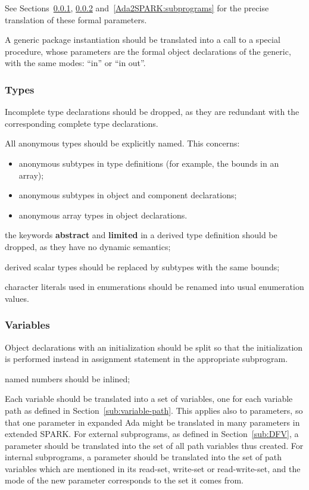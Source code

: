 \documentclass{article}
\newcounter{example}
\newcommand{\kw}[1]{\textbf{#1}}
\begin{document}
See Sections~\ref{Ada2SPARK:types}, \ref{Ada2SPARK:variables}
and~\ref{Ada2SPARK:subprograms} for the precise translation of these formal
parameters.

A generic package instantiation should be translated into a call to a special
procedure, whose parameters are the formal object declarations of the generic,
with the same modes: ``in'' or ``in out''.

\subsubsection{Types}
\label{Ada2SPARK:types}

Incomplete type declarations should be dropped, as they are redundant with the
corresponding complete type declarations.

All anonymous types should be explicitly named. This concerns:
\begin{itemize}
\item anonymous subtypes in type definitions (for example, the bounds in an
  array);
\item anonymous subtypes in object and component declarations;
\item anonymous array types in object declarations.
\end{itemize}

the keywords \kw{abstract} and \kw{limited} in a derived type definition
  should be dropped, as they have no dynamic semantics;

derived scalar types should be replaced by subtypes with the same bounds;

character literals used in enumerations should be renamed into usual
  enumeration values.

\subsubsection{Variables}
\label{Ada2SPARK:variables}

Object declarations with an initialization should be split so that the
initialization is performed instead in assignment statement in the appropriate
subprogram.

named numbers should be inlined;

Each variable should be translated into a set of variables, one for each
variable path as defined in Section~\ref{sub:variable-path}. This applies also
to parameters, so that one parameter in expanded Ada might be translated in
many parameters in extended SPARK. For external subprograms, as defined in
Section~\ref{sub:DFV}, a parameter should be translated into the set of all
path variables thus created. For internal subprograms, a parameter should be
translated into the set of path variables which are mentioned in its read-set,
write-set or read-write-set, and the mode of the new parameter corresponds to
the set it comes from.
\end{document}
